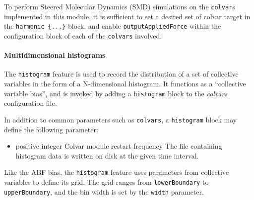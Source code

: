 To perform Steered Molecular Dynamics (SMD) simulations on the
\texttt{colvar}s implemented in this module, it is sufficient to set a
desired set of colvar target in the \texttt{harmonic~\{...\}} block,
and enable \texttt{outputAppliedForce} within the configuration block
of each of the \texttt{colvars} involved.


\paragraph*{Multidimensional histograms}
\label{sec:colvarbias_histogram}

The \texttt{histogram} feature is used to record the distribution of a set of collective
variables in the form of a N-dimensional histogram.
It functions as a ``collective variable bias'', and is invoked by adding a
\texttt{histogram} block to the \textit{colvars} configuration file.

In addition to common parameters such as \texttt{colvars}, a \texttt{histogram} block
may define the following parameter:

\begin{itemize}
\item {}
  {positive integer}
  {Colvar module restart frequency}
  {The file containing histogram data is written on disk at the given time interval.}
\end{itemize}

Like the ABF bias, the \texttt{histogram} feature uses parameters from
collective variables to define its grid. The grid ranges from
\texttt{lowerBoundary} to \texttt{upperBoundary}, and the bin width is
set by the \texttt{width} parameter.

